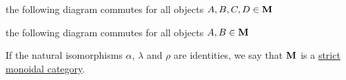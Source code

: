 \begin{definition}
\begin{defenum}
    \item the following diagram commutes for all objects $A, B, C, D \in \operatorname{\mathbf{M}}$
    \begin{center}
    \end{center}

    \item the following diagram commutes for all objects $A, B \in \operatorname{\mathbf{M}}$
    \begin{center}
    \end{center}
  \end{defenum}

  If the natural isomorphisms $\alpha$, $\lambda$ and $\rho$ are identities, we say that $\operatorname{\mathbf{M}}$ is a \uline{strict monoidal category}.
\end{definition}

